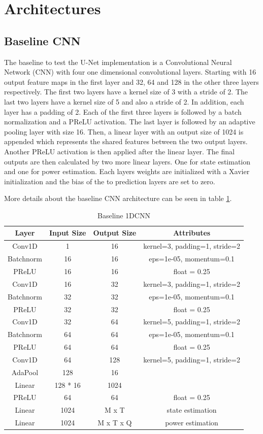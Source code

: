 \documentclass[sigconf]{acmart}
\begin{document}
\section{Architectures}\label{chapter:architecture}
\subsection{Baseline CNN}
The baseline to test the U-Net implementation is a Convolutional Neural Network (CNN) with four one dimensional convolutional layers.
Starting with 16 output feature maps in the first layer and 32, 64 and 128 in the other three layers respectively.
The first two layers have a kernel size of 3 with a stride of 2. 
The last two layers have a kernel size of 5 and also a stride of 2.
In addition, each layer has a padding of 2.
Each of the first three layers is followed by a batch normalization and a PReLU activation.
The last layer is followed by an adaptive pooling layer with size 16.
Then, a linear layer with an output size of 1024 is appended which represents the shared features between the two output layers.
Another PReLU activation is then applied after the linear layer.
The final outputs are then calculated by two more linear layers.
One for state estimation and one for power estimation.
Each layers weights are initialized with a Xavier initialization and the bias of the to prediction layers are set to zero.

More details about the baseline CNN architecture can be seen in table \ref{tab:1dcnn}.


\begin{table}
  \caption{Baseline 1DCNN}
  \begin{tabular}{c c c c}
    \hline\hline
    Layer & Input Size & Output Size & Attributes\\
    \hline
    Conv1D & 1 & 16 & kernel=3, padding=1, stride=2 \\
    Batchnorm & 16 & 16 & eps=1e-05, momentum=0.1\\ 
    PReLU & 16 & 16 & float = 0.25\\
    Conv1D & 16 & 32 & kernel=3, padding=1, stride=2 \\
    Batchnorm& 32 & 32 & eps=1e-05, momentum=0.1\\
    PReLU & 32 & 32 & float = 0.25\\
    Conv1D & 32 & 64 & kernel=5, padding=1, stride=2 \\
    Batchnorm & 64 & 64 & eps=1e-05, momentum=0.1\\
    PReLU & 64 & 64 & float = 0.25\\
    Conv1D & 64 & 128 & kernel=5, padding=1, stride=2 \\
    AdaPool & 128 & 16 & \\
    Linear & 128 * 16 & 1024 & \\
    PReLU & 64 & 64 & float = 0.25\\
    Linear & 1024 & M x T & state estimation \\
    Linear & 1024 & M x T x Q & power estimation \\
    \hline
  \end{tabular}
  \label{tab:1dcnn}
  \end{table}
\end{document}
